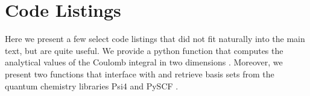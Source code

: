 \chapter{Code Listings}

Here we present a few select code listings that did not fit naturally into the 
main text, but are quite useful. We provide a python function that computes the 
analytical values of the Coulomb integral in two
dimensions \cite{anisimovas1998energy}. Moreover, we present two 
functions that interface with and retrieve basis sets from the quantum chemistry
libraries Psi4 \cite{parrish2017psi4} and PySCF \cite{PYSCF}.





\clearemptydoublepage